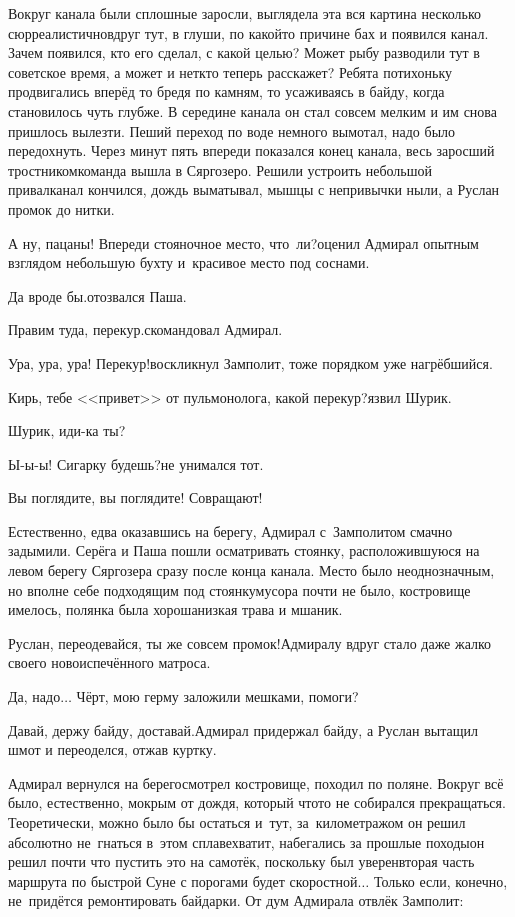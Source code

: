 Вокруг канала были сплошные заросли, выглядела эта вся картина несколько сюрреалистично\mdash вдруг тут, в глуши, по какой\sdash то причине бах и появился канал. Зачем появился, кто его сделал, с какой целью? Может рыбу разводили тут в советское время, а может и нет\mdash кто теперь расскажет? Ребята потихоньку продвигались вперёд то бредя по камням, то усаживаясь в байду, когда становилось чуть глубже. В середине канала он стал совсем мелким и им снова пришлось вылезти. Пеший переход по воде немного вымотал, надо было передохнуть. Через минут пять впереди показался конец канала, весь заросший тростником\mdash команда вышла в Сяргозеро. Решили устроить небольшой привал\mdash канал кончился, дождь выматывал, мышцы с непривычки ныли, а Руслан промок до нитки.

\diagdash А ну, пацаны! Впереди стояночное место, что~ли?\mdash оценил Адмирал опытным взглядом небольшую бухту и~красивое место под соснами.

\diagdash Да вроде бы.\mdash отозвался Паша.

\diagdash Правим туда, перекур.\mdash скомандовал Адмирал. 

\diagdash Ура, ура, ура! Перекур!\mdash воскликнул Замполит, тоже порядком уже нагрёбшийся.

\diagdash Кирь, тебе <<привет>> от пульмонолога, какой перекур?\mdash язвил Шурик.

\diagdash Шурик, иди-ка ты?

\diagdash Ы-ы-ы! Сигарку будешь?\mdash не унимался тот.

\diagdash Вы поглядите, вы поглядите! Совращают!

Естественно, едва оказавшись на берегу, Адмирал с~Замполитом смачно задымили. Серёга и Паша пошли осматривать стоянку, расположившуюся на левом берегу Сяргозера сразу после конца канала. Место было неоднозначным, но вполне себе подходящим под стоянку\mdash мусора почти не было, костровище имелось, полянка была хороша\mdash низкая трава и мшаник.

\diagdash Руслан, переодевайся, ты же совсем промок!\mdash Адмиралу вдруг стало даже жалко своего новоиспечённого матроса. 

\diagdash Да, надо$\ldots$ Чёрт, мою герму заложили мешками, помоги?

\diagdash Давай, держу байду, доставай.\mdash Адмирал придержал байду, а Руслан вытащил шмот и переоделся, отжав куртку. 

Адмирал вернулся на берег\mdash осмотрел костровище, походил по поляне. Вокруг всё было, естественно, мокрым от дождя, который что\sdash то не собирался прекращаться. Теоретически, можно было бы остаться и~тут, за~километражом он решил абсолютно не~гнаться в~этом сплаве\mdash хватит, набегались за прошлые походы\mdash он решил почти что пустить это на самотёк, поскольку был уверен\mdash вторая часть маршрута по быстрой Суне с порогами будет скоростной$\ldots$ Только если, конечно, не~придётся ремонтировать байдарки. От дум Адмирала отвлёк Замполит:

